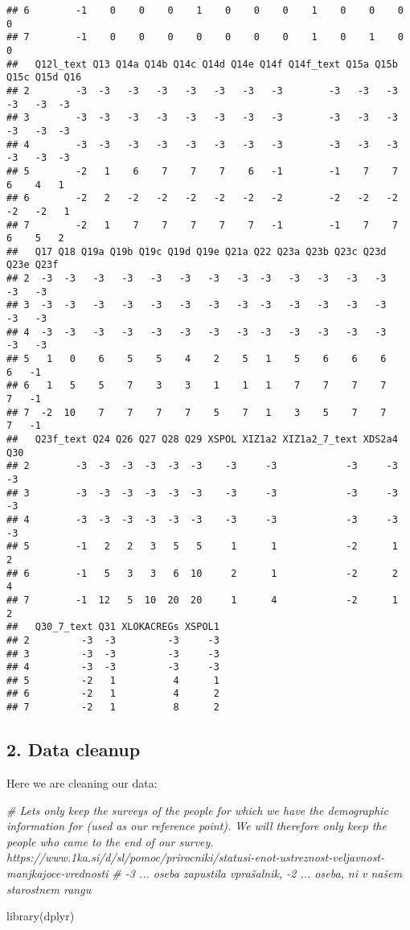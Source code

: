 \documentclass[
]{article}
\newenvironment{Shaded}{\begin{snugshade}}{\end{snugshade}}
\newcommand{\CommentTok}[1]{\textcolor[rgb]{0.56,0.35,0.01}{\textit{#1}}}
\newcommand{\FunctionTok}[1]{\textcolor[rgb]{0.00,0.00,0.00}{#1}}
\newcommand{\NormalTok}[1]{#1}
\begin{document}
\begin{verbatim}
## 6        -1    0    0    0    1    0    0    0    1    0    0    0    0
## 7        -1    0    0    0    0    0    0    0    1    0    1    0    0
##   Q12l_text Q13 Q14a Q14b Q14c Q14d Q14e Q14f Q14f_text Q15a Q15b Q15c Q15d Q16
## 2        -3  -3   -3   -3   -3   -3   -3   -3        -3   -3   -3   -3   -3  -3
## 3        -3  -3   -3   -3   -3   -3   -3   -3        -3   -3   -3   -3   -3  -3
## 4        -3  -3   -3   -3   -3   -3   -3   -3        -3   -3   -3   -3   -3  -3
## 5        -2   1    6    7    7    7    6   -1        -1    7    7    6    4   1
## 6        -2   2   -2   -2   -2   -2   -2   -2        -2   -2   -2   -2   -2   1
## 7        -2   1    7    7    7    7    7   -1        -1    7    7    6    5   2
##   Q17 Q18 Q19a Q19b Q19c Q19d Q19e Q21a Q22 Q23a Q23b Q23c Q23d Q23e Q23f
## 2  -3  -3   -3   -3   -3   -3   -3   -3  -3   -3   -3   -3   -3   -3   -3
## 3  -3  -3   -3   -3   -3   -3   -3   -3  -3   -3   -3   -3   -3   -3   -3
## 4  -3  -3   -3   -3   -3   -3   -3   -3  -3   -3   -3   -3   -3   -3   -3
## 5   1   0    6    5    5    4    2    5   1    5    6    6    6    6   -1
## 6   1   5    5    7    3    3    1    1   1    7    7    7    7    7   -1
## 7  -2  10    7    7    7    7    5    7   1    3    5    7    7    7   -1
##   Q23f_text Q24 Q26 Q27 Q28 Q29 XSPOL XIZ1a2 XIZ1a2_7_text XDS2a4 Q30
## 2        -3  -3  -3  -3  -3  -3    -3     -3            -3     -3  -3
## 3        -3  -3  -3  -3  -3  -3    -3     -3            -3     -3  -3
## 4        -3  -3  -3  -3  -3  -3    -3     -3            -3     -3  -3
## 5        -1   2   2   3   5   5     1      1            -2      1   2
## 6        -1   5   3   3   6  10     2      1            -2      2   4
## 7        -1  12   5  10  20  20     1      4            -2      1   2
##   Q30_7_text Q31 XLOKACREGs XSPOL1
## 2         -3  -3         -3     -3
## 3         -3  -3         -3     -3
## 4         -3  -3         -3     -3
## 5         -2   1          4      1
## 6         -2   1          4      2
## 7         -2   1          8      2
\end{verbatim}

\hypertarget{data-cleanup}{%
\subsection{2. Data cleanup}\label{data-cleanup}}

Here we are cleaning our data:

\begin{Shaded}
\begin{Highlighting}[]
\CommentTok{\# Lets only keep the surveys of the people for which we have the demographic information for (used as our reference point). We will therefore only keep the people who came to the end of our survey. https://www.1ka.si/d/sl/pomoc/prirocniki/statusi{-}enot{-}ustreznost{-}veljavnost{-}manjkajoce{-}vrednosti}
\CommentTok{\# {-}3 ... oseba zapustila vprašalnik, {-}2 ... oseba, ni v našem starostnem rangu}

\FunctionTok{library}\NormalTok{(dplyr)}
\end{Highlighting}
\end{Shaded}
\end{document}
